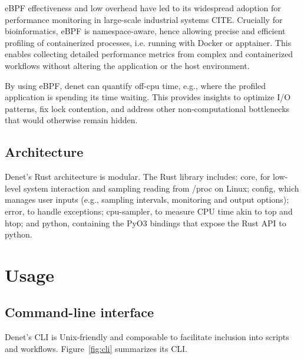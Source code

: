 \documentclass[10pt]{article}
\begin{document}
eBPF effectiveness and low overhead have led to its widespread adoption for performance monitoring in large-scale industrial systems {\color{red} CITE}. Crucially for bioinformatics, eBPF is namespace-aware, hence allowing precise and efficient profiling of containerized processes, i.e. running with Docker or apptainer. This enables collecting detailed performance metrics from complex and containerized workflows without altering the application or the host environment.

By using eBPF, denet can quantify off-cpu time, e.g., where the profiled application is spending its time waiting. This provides insights to optimize I/O patterns, fix lock contention, and address other non-computational bottlenecks that would otherwise remain hidden.

\subsection*{Architecture}

Denet's Rust architecture is modular. The Rust library includes: core, for low-level system interaction and sampling reading from /proc on Linux; config, which manages user inputs (e.g., sampling intervals, monitoring and output options); error, to handle exceptions; cpu-sampler, to measure CPU time akin to top and htop; and python, containing the PyO3 bindings that expose the Rust API to python.

\section*{Usage}

\subsection*{Command-line interface}

Denet's CLI is Unix-friendly \cite{raymond1999cathedral} and composable to facilitate inclusion into scripts and workflows. Figure~\ref{fig:cli} summarizes its CLI.\\
\end{document}
